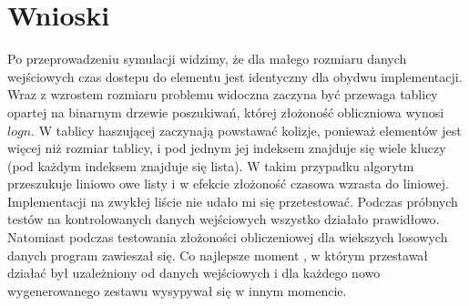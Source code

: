 \documentclass[10pt,oneside]{mwbk}
\begin{document}
\section {Wnioski}
\indent Po przeprowadzeniu symulacji widzimy, że dla małego rozmiaru danych wejściowych czas dostepu do elementu jest identyczny dla obydwu implementacji.
Wraz z wzrostem rozmiaru problemu widoczna zaczyna być przewaga tablicy opartej na binarnym drzewie poszukiwań, której złożoność obliczniowa wynosi $logn$. W tablicy haszującej zaczynają powstawać kolizje, ponieważ elementów jest więcej niż rozmiar tablicy, i pod jednym jej indeksem znajduje się wiele kluczy (pod każdym indeksem znajduje się lista).
W takim przypadku algorytm przeszukuje liniowo owe listy i w efekcie złożoność czasowa wzrasta do liniowej. \\
\indent Implementacji na zwykłej liście nie udało mi się przetestować. Podczas próbnych testów na kontrolowanych danych wejściowych wszystko działało prawidłowo. Natomiast podczas testowania złożoności obliczeniowej dla wiekszych losowych danych program zawieszał się.
Co najlepsze moment , w którym przestawał działać był uzależniony od danych wejściowych i dla każdego  nowo wygenerowanego zestawu wysypywał się w innym momencie.
\end{document}
